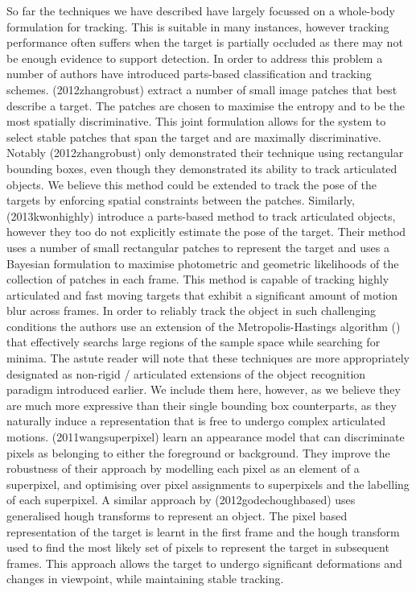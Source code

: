 So far the techniques we have described have largely focussed on a whole-body formulation for tracking. This is suitable in many instances, however tracking performance often suffers when the target is partially occluded as there may not be enough evidence to support detection. In order to address this problem a number of authors have introduced parts-based classification and tracking schemes. (2012zhangrobust) extract a number of small image patches that best describe a target. The patches are chosen to maximise the entropy and to be the most spatially discriminative. This joint formulation allows for the system to select stable patches that span the target and are maximally discriminative. Notably (2012zhangrobust) only demonstrated their technique using rectangular bounding boxes, even though they demonstrated its ability to track articulated objects. We believe this method could be extended to track the pose of the targets by enforcing spatial constraints between the patches.  Similarly, (2013kwonhighly) introduce a parts-based method to track articulated objects, however they too do not explicitly estimate the pose of the target. Their method uses a number of small rectangular patches to represent the target and uses a Bayesian formulation to maximise photometric and geometric likelihoods of the collection of patches in each frame. This method is capable of tracking highly articulated and fast moving targets that exhibit a significant amount of motion blur across frames. In order to reliably track the object in such challenging conditions the authors use an extension of the Metropolis-Hastings algorithm () that effectively searchs large regions of the sample space while searching for minima. The astute reader will note that these techniques are more appropriately designated as non-rigid / articulated extensions of the object recognition paradigm introduced earlier. We include them here, however, as we believe they are much more expressive than their single bounding box counterparts, as they naturally induce a representation that is free to undergo complex articulated motions. (2011wangsuperpixel) learn an appearance model that can discriminate pixels as belonging to either the foreground or background. They improve the robustness of their approach by modelling each pixel as an element of a superpixel, and optimising over pixel assignments to superpixels and the labelling of each superpixel. A similar approach by (2012godechoughbased) uses generalised hough transforms to represent an object. The pixel based representation of the target is learnt in the first frame and the hough transform used to find the most likely set of pixels to represent the target in subsequent frames. This approach allows the target to undergo significant deformations and changes in viewpoint, while maintaining stable tracking. 
 
